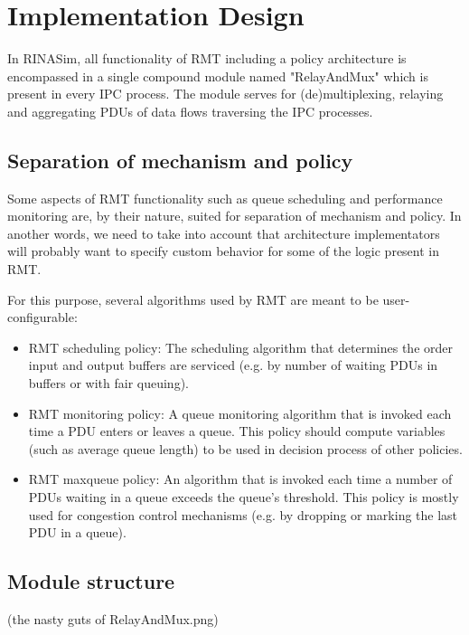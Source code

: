     \section{Implementation Design}

        In RINASim, all functionality of RMT including a policy architecture is encompassed in a single compound module named "RelayAndMux" which is present in every IPC process. The module serves for (de)multiplexing, relaying and aggregating PDUs of data flows traversing the IPC processes.

        \subsection{Separation of mechanism and policy}
            Some aspects of RMT functionality such as queue scheduling and performance monitoring are, by their nature, suited for separation of mechanism and policy. In another words, we need to take into account that architecture implementators will probably want to specify custom behavior for some of the logic present in RMT.

            For this purpose, several algorithms used by RMT are meant to be user-configurable:

            \begin{itemize}
                \item RMT scheduling policy: The scheduling algorithm that determines the order input and output buffers are serviced (e.g. by number of waiting PDUs in buffers or with fair queuing).
                \item RMT monitoring policy: A queue monitoring algorithm that is invoked each time a PDU enters or leaves a queue. This policy should compute variables (such as average queue length) to be used in decision process of other policies.
                \item RMT maxqueue policy: An algorithm that is invoked each time a number of PDUs waiting in a queue exceeds the queue's threshold. This policy is mostly used for congestion control mechanisms (e.g. by dropping or marking the last PDU in a queue).
            \end{itemize}

        \subsection{Module structure}

            (the nasty guts of RelayAndMux.png)

